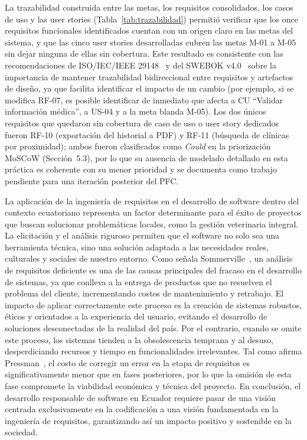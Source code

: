 \documentclass[journal,onecolumn]{IEEEtran}
\begin{document}
La trazabilidad construida entre las metas, los requisitos consolidados,
los casos de uso y las user stories (Tabla~\ref{tab:trazabilidad}) permitió
verificar que los once requisitos funcionales identificados cuentan con un
origen claro en las metas del sistema, y que las cinco user stories
desarrolladas cubren las metas M-01 a M-05 sin dejar ninguna de ellas sin
cobertura. Este resultado es consistente con las recomendaciones de
ISO/IEC/IEEE 29148~\cite{iso29148} y del SWEBOK v4.0~\cite{swebok2024} sobre
la importancia de mantener trazabilidad bidireccional entre requisitos y
artefactos de diseño, ya que facilita identificar el impacto de un cambio
(por ejemplo, si se modifica RF-07, es posible identificar de inmediato que
afecta a CU ``Validar información médica'', a US-04 y a la meta blanda
M-05). Los dos únicos requisitos que quedaron sin cobertura de caso de uso o
user story dedicados fueron RF-10 (exportación del historial a PDF) y RF-11
(búsqueda de clínicas por proximidad); ambos fueron clasificados como
\textit{Could} en la priorización MoSCoW (Sección~5.3), por lo que su
ausencia de modelado detallado en esta práctica es coherente con su menor
prioridad y se documenta como trabajo pendiente para una iteración
posterior del PFC.

La aplicación de la ingeniería de requisitos en el desarrollo de software
dentro del contexto ecuatoriano representa un factor determinante para el
éxito de proyectos que buscan solucionar problemáticas locales, como la
gestión veterinaria integral. La elicitación y el análisis riguroso
permiten que el software no solo sea una herramienta técnica, sino una
solución adaptada a las necesidades reales, culturales y sociales de
nuestro entorno. Como señala Sommerville~\cite{sommerville2018}, un
análisis de requisitos deficiente es una de las causas principales del
fracaso en el desarrollo de sistemas, ya que conlleva a la entrega de
productos que no resuelven el problema del cliente, incrementando costos de
mantenimiento y retrabajo. El impacto de aplicar correctamente este proceso
es la creación de sistemas robustos, éticos y orientados a la experiencia
del usuario, evitando el desarrollo de soluciones desconectadas de la
realidad del país. Por el contrario, cuando se omite este proceso, los
sistemas tienden a la obsolescencia temprana y al desuso, desperdiciando
recursos y tiempo en funcionalidades irrelevantes. Tal como afirma
Pressman~\cite{pressman2010}, el costo de corregir un error en la etapa de
requisitos es significativamente menor que en fases posteriores, por lo que
la omisión de esta fase compromete la viabilidad económica y técnica del
proyecto. En conclusión, el desarrollo responsable de software en Ecuador
requiere pasar de una visión centrada exclusivamente en la codificación a
una visión fundamentada en la ingeniería de requisitos, garantizando así un
impacto positivo y sostenible en la sociedad.
\end{document}
